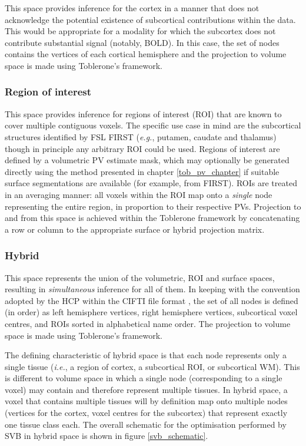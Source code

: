 This space provides inference for the cortex in a manner that does not acknowledge the potential existence of subcortical contributions within the data. This would be appropriate for a modality for which the subcortex does not contribute substantial signal (notably, BOLD). In this case, the set of nodes contains the vertices of each cortical hemisphere and the projection to volume space is made using Toblerone's framework. 

\subsubsection{Region of interest}

This space provides inference for regions of interest (ROI) that are known to cover multiple contiguous voxels. The specific use case in mind are the subcortical structures identified by FSL FIRST (\textit{e.g.}, putamen, caudate and thalamus) though in principle any arbitrary ROI could be used. Regions of interest are defined by a volumetric PV estimate mask, which may optionally be generated directly using the method presented in chapter \ref{tob_pv_chapter} if suitable surface segmentations are available (for example, from FIRST). ROIs are treated in an averaging manner: all voxels within the ROI map onto a \textit{single} node representing the entire region, in proportion to their respective PVs. Projection to and from this space is achieved within the Toblerone framework by concatenating a row or column to the appropriate surface or hybrid projection matrix. 

\subsubsection{Hybrid}

This space represents the union of the volumetric, ROI and surface spaces, resulting in \textit{simultaneous} inference for all of them. In keeping with the convention adopted by the HCP within the CIFTI file format \cite{Glasser2013}, the set of all nodes is defined (in order) as left hemisphere vertices, right hemisphere vertices, subcortical voxel centres, and ROIs sorted in alphabetical name order. The projection to volume space is made using Toblerone's framework. 

The defining characteristic of hybrid space is that each node represents only a single tissue (\textit{i.e.}, a region of cortex, a subcortical ROI, or subcortical WM). This is different to volume space in which a single node (corresponding to a single voxel) may contain and therefore represent multiple tissues. In hybrid space, a voxel that contains multiple tissues will by definition map onto multiple nodes (vertices for the cortex, voxel centres for the subcortex) that represent exactly one tissue class each. The overall schematic for the optimisation performed by SVB in hybrid space is shown in figure \ref{svb_schematic}.

